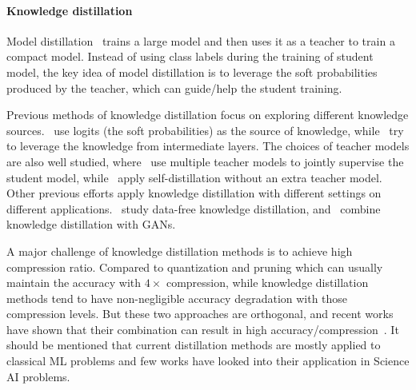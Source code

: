 \paragraph{Knowledge distillation}
Model distillation~\cite{romero2014fitnets, hinton2015distilling, mishra2017apprentice, li2017learning, yim2017gift, polino2018model, ahn2019variational, yin2020dreaming} trains a large model and then uses it as a teacher to train a compact model. Instead of using class labels during the training of student model, the key idea of model distillation is to leverage the soft probabilities produced by the teacher, 
which can guide/help the student training. 

Previous methods of knowledge distillation focus on exploring different knowledge sources.~\cite{hinton2015distilling, li2017learning, park2019relational} use logits (the soft probabilities) as the source of knowledge, while~\cite{romero2014fitnets, yim2017gift, ahn2019variational} try to leverage the knowledge from intermediate layers. The choices of teacher models are also well studied, where~\cite{you2017learning, tarvainen2017mean} use multiple teacher models to jointly supervise the student model, while~\cite{crowley2018moonshine, zhang2019your} apply self-distillation without an extra teacher model. Other previous efforts apply knowledge distillation with different settings on different applications.~\cite{lopes2017data, nayak2019zero, yin2020dreaming} study data-free knowledge distillation, and~\cite{wang2018kdgan, wang2020minegan} combine knowledge distillation with GANs.

A major challenge of knowledge distillation methods is to achieve high compression ratio. 
Compared to quantization and pruning which can usually maintain the accuracy with $4\times$ compression, while knowledge distillation methods tend to have non-negligible accuracy degradation with those compression levels. 
But these two approaches are orthogonal, and recent works have
shown that their combination can result in high accuracy/compression~\cite{polino2018model,mishra2017apprentice,yao2020hawqv3,mao2020ladabert}.
It should be mentioned that current distillation methods are mostly applied to classical ML problems and few works have looked into their application in Science AI problems.


